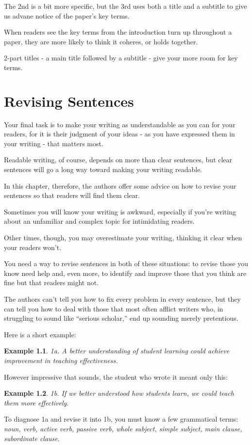 \documentclass[oneside]{book}
\numberwithin{equation}{section}
\newtheorem{example}{Example}[section]
\begin{document}
The 2nd is a bit more specific, but the 3rd uses both a title and a subtitle to give us advane notice of the paper's key terms.

When readers see the key terms from the introduction turn up throughout a paper, they are more likely to think it coheres, or holds together.

2-part titles - a main title followed by a subtitle - give your more room for key terms.


\chapter{Revising Sentences}
Your final task is to make your writing as understandable as you can for your readers, for it is their judgment of your ideas - as you have expressed them in your writing - that matters most.

Readable writing, of course, depends on more than clear sentences, but clear sentences will go a long way toward making your writing readable.

In this chapter, therefore, the authors offer some advice on how to revise your sentences so that readers will find them clear.

%
Sometimes you will know your writing is awkward, especially if you're writing about an unfamiliar and complex topic for intimidating readers.

Other times, though, you may overestimate your writing, thinking it clear when your readers won't.

You need a way to revise sentences in both of these situations: to revise those you know need help and, even more, to identify and improve those that you think are fine but that readers might not.

%
The authors can't tell you how to fix every problem in every sentence, but they can tell you how to deal with those that most often afflict writers who, in struggling to sound like ``serious scholar,'' end up sounding merely pretentious.

Here is a short example:
\begin{example}
    1a. A better understanding of student learning could achieve improvement in teaching effectiveness.
\end{example}
However impressive that sounds, the student who wrote it meant only this:
\begin{example}
    1b. If we better understood how students learn, we could teach them more effectively.
\end{example}
To diagnose 1a and revise it into 1b, you must know a few grammatical terms: \textit{noun, verb, active verb, passive verb, whole subject, simple subject, main clause, subordinate clause}.
\end{document}
